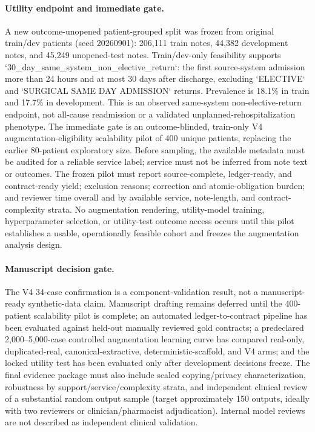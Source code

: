 \documentclass[11pt]{article}
\begin{document}
\paragraph{Utility endpoint and immediate gate.} A new outcome-unopened patient-grouped split was frozen from original train/dev patients (seed 20260901): 206,111 train notes, 44,382 development notes, and 45,249 unopened-test notes.  Train/dev-only feasibility supports `30_day_same_system_non_elective_return`: the first source-system admission more than 24 hours and at most 30 days after discharge, excluding `ELECTIVE` and `SURGICAL SAME DAY ADMISSION` returns.  Prevalence is 18.1\% in train and 17.7\% in development.  This is an observed same-system non-elective-return endpoint, not all-cause readmission or a validated unplanned-rehospitalization phenotype.  The immediate gate is an outcome-blinded, train-only V4 augmentation-eligibility scalability pilot of 400 unique patients, replacing the earlier 80-patient exploratory size.  Before sampling, the available metadata must be audited for a reliable service label; service must not be inferred from note text or outcomes.  The frozen pilot must report source-complete, ledger-ready, and contract-ready yield; exclusion reasons; correction and atomic-obligation burden; and reviewer time overall and by available service, note-length, and contract-complexity strata.  No augmentation rendering, utility-model training, hyperparameter selection, or utility-test outcome access occurs until this pilot establishes a usable, operationally feasible cohort and freezes the augmentation analysis design.

\paragraph{Manuscript decision gate.} The V4 34-case confirmation is a component-validation result, not a manuscript-ready synthetic-data claim.  Manuscript drafting remains deferred until the 400-patient scalability pilot is complete; an automated ledger-to-contract pipeline has been evaluated against held-out manually reviewed gold contracts; a predeclared 2,000--5,000-case controlled augmentation learning curve has compared real-only, duplicated-real, canonical-extractive, deterministic-scaffold, and V4 arms; and the locked utility test has been evaluated only after development decisions freeze.  The final evidence package must also include scaled copying/privacy characterization, robustness by support/service/complexity strata, and independent clinical review of a substantial random output sample (target approximately 150 outputs, ideally with two reviewers or clinician/pharmacist adjudication).  Internal model reviews are not described as independent clinical validation.
\end{document}
